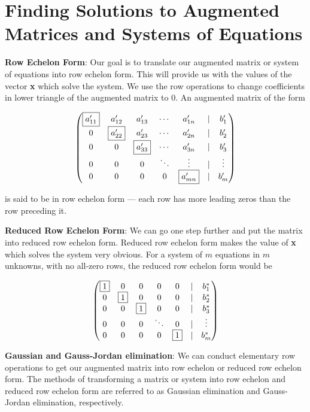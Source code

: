 \documentclass[]{book}
\theoremstyle{definition}
\theoremstyle{definition}
\theoremstyle{definition}
\theoremstyle{remark}
\begin{document}
\section{Finding Solutions to Augmented Matrices and Systems of
Equations}\label{finding-solutions-to-augmented-matrices-and-systems-of-equations}

\textbf{Row Echelon Form}: Our goal is to translate our augmented matrix
or system of equations into row echelon form. This will provide us with
the values of the vector \textbf{x} which solve the system. We use the
row operations to change coefficients in lower triangle of the augmented
matrix to 0. An augmented matrix of the form

\[\begin{pmatrix}
            \fbox{$a'_{11}$}& a'_{12} & a'_{13}& \cdots & a'_{1n} & | & b'_1\\
            0 & \fbox{$a'_{22}$} & a'_{23}& \cdots & a'_{2n} & | & b'_2\\
            0 & 0 & \fbox{$a'_{33}$}& \cdots & a'_{3n} & | & b'_3\\
            0 & 0 &0 & \ddots & \vdots  & | & \vdots \\
            0 & 0 &0 &0 & \fbox{$a'_{mn}$} & | & b'_m
            \end{pmatrix}\]

is said to be in row echelon form --- each row has more leading zeros
than the row preceding it.

\textbf{Reduced Row Echelon Form}: We can go one step further and put
the matrix into reduced row echelon form. Reduced row echelon form makes
the value of \textbf{x} which solves the system very obvious. For a
system of \(m\) equations in \(m\) unknowns, with no all-zero rows, the
reduced row echelon form would be

\[\begin{pmatrix}
            \fbox{$1$}  &  0 &   0 &    0  &   0 & | & b^*_1\\
            0  &  \fbox{$1$} &   0 &    0  &   0 & | & b^*_2\\
            0  &  0 &   \fbox{$1$} &    0  &   0 & | & b^*_3\\
            0  &  0 &   0 &\ddots &   0 & | &\vdots\\
            0  &  0 &   0 &    0  &   \fbox{$1$} & | & b^*_m
            \end{pmatrix}\]

\textbf{Gaussian and Gauss-Jordan elimination}: We can conduct
elementary row operations to get our augmented matrix into row echelon
or reduced row echelon form. The methods of transforming a matrix or
system into row echelon and reduced row echelon form are referred to as
Gaussian elimination and Gauss-Jordan elimination, respectively.
\end{document}
